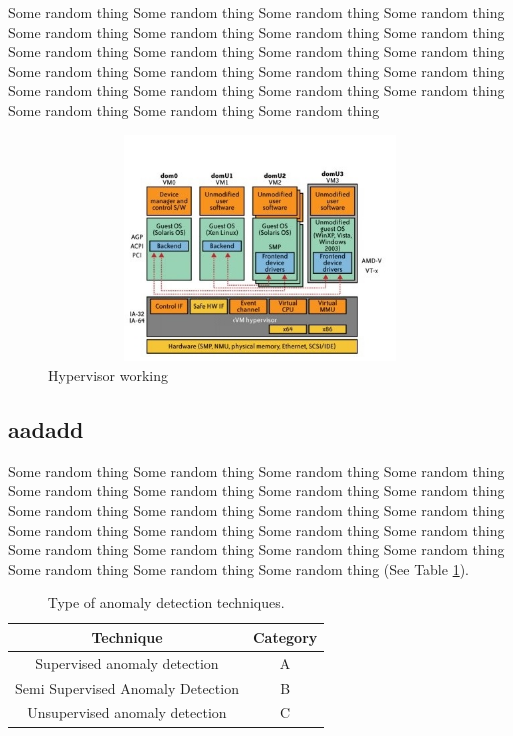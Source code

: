 Some random thing Some random thing Some random thing Some random thing Some random thing Some random thing Some random thing Some random thing Some random thing Some random thing Some random thing Some random thing Some random thing Some random thing Some random thing Some random thing Some random thing Some random thing Some random thing Some random thing Some random thing Some random thing Some random thing  
\begin{figure}[H]
\begin{center}
	\includegraphics[width=15cm,height=60mm]{texfiles/images/hypervisor1.jpg}
  \caption{Hypervisor working \protect\cite{Virtuali40:online}}
  \label{fig:hypervisors} 
\end{center}
\end{figure}

\subsection{aadadd}

Some random thing Some random thing Some random thing Some random thing Some random thing Some random thing Some random thing Some random thing Some random thing Some random thing Some random thing Some random thing Some random thing Some random thing Some random thing Some random thing Some random thing Some random thing Some random thing Some random thing Some random thing Some random thing Some random thing   (See Table \ref{tab:technique-cat}).
\begin{table}[h!]
\begin{center}
\vspace{1ex}
\begin{tabular}{|c|c|} \hline
    {\bf Technique} & {\bf Category} \\\hline
    Supervised anomaly detection &   A\\
    \hline
    Semi Supervised Anomaly Detection & B \\ \hline
    Unsupervised anomaly detection & C\\
    \hline
\end{tabular}
\caption{\label{tab:technique-cat}Type of anomaly detection techniques.}
\end{center}
\end{table}


